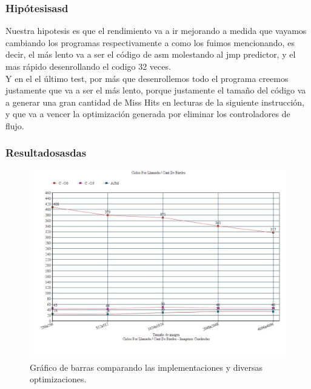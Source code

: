 \subsubsection{Hipótesisasd}
	Nuestra hipotesis es que el rendimiento va a ir mejorando a medida que vayamos cambiando los programas respectivamente a como los fuimos mencionando, es decir, el más lento va a ser el código de asm molestando al jmp predictor, y el mas rápido desenrollando el codigo 32 veces. \\
	Y en el el último test, por más que desenrollemos todo el programa creemos justamente que va a ser el más lento, porque justamente el tamaño del código va a generar una gran cantidad de Miss Hits en lecturas de la siguiente instrucción, y que va a vencer la optimización generada por eliminar los controladores de flujo.	
	
\subsubsection{Resultadosasdas}

\begin{figure}[h!]
\centering
\captionsetup{justification=centering}
	\includegraphics[width = 15 cm, height = 8 cm]{imagenes/ImgCuadradas.jpg}
	\caption[center]{Gráfico de barras comparando las implementaciones y diversas optimizaciones.}
\end{figure}

\medskip

